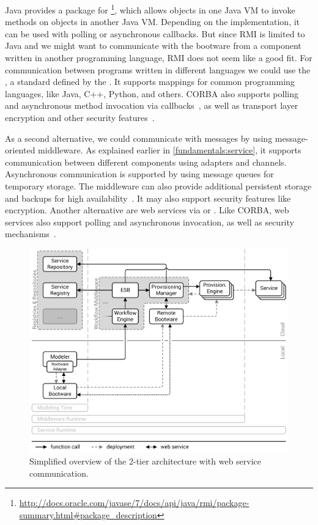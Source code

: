 Java provides a package for \footnote{\url{http://docs.oracle.com/javase/7/docs/api/java/rmi/package-summary.html\#package_description}}, which allows objects in one Java VM to invoke methods on objects in another Java VM.
Depending on the implementation, it can be used with polling or asynchronous callbacks.
But since RMI is limited to Java and we might want to communicate with the bootware from a component written in another programming language, RMI does not seem like a good fit.
For communication between programs written in different languages we could use the , a standard defined by the .
It supports mappings for common programming languages, like Java, C++, Python, and others.
CORBA also supports polling and asynchronous method invocation via callbacks~\autocite{corba:async}, as well as transport layer encryption and other security features~\autocite{corba:security}.

As a second alternative, we could communicate with messages by using message-oriented middleware.
As explained earlier in \autoref{fundamentals:service}, it supports communication between different components using adapters and channels.
Asynchronous communication is supported by using message queues for temporary storage.
The middleware can also provide additional persistent storage and backups for high availability~\autocite{mom}.
It may also support security features like encryption.
Another alternative are web services via  or .
Like CORBA, web services also support polling and asynchronous invocation, as well as security mechanisms~\autocite{ws:security}.

\begin{figure}[!htbp]
	\centering
	\includegraphics[resolution=600]{design/assets/webservice}
	\caption{Simplified overview of the 2-tier architecture with web service communication.}
	\label{image:webservice}
\end{figure}

